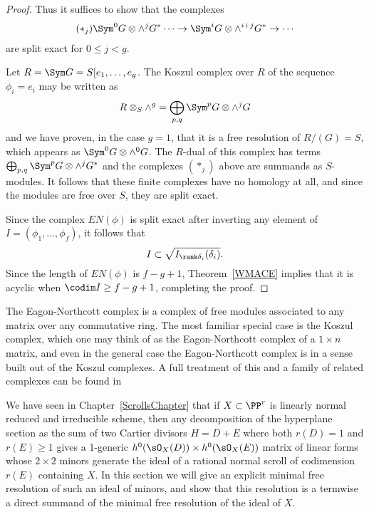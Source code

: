 \begin{proof}
Thus it suffices to show that the complexes
$$
\begin{aligned}
 (*_{j}) \Sym^{0}G\otimes\wedge^{j}G^{*}\cdots \to \Sym^{i}G \otimes  \wedge^{i+j}G^{*}  \to \cdots
\end{aligned}
$$
are split exact for $0\leq j<g$.

Let $R = \Sym G = S[e_{1}, \dots, e_{g}$. The Koszul complex over $R$ of the sequence $\phi_{i} = e_{i}$
may be written as
$$
R\otimes_{S} \wedge^{g} = \bigoplus_{p,q}\Sym^{p}G\otimes\wedge^{j}G
$$
and we have proven, in the case $g=1$, that it is a free resolution of $R/(G)=S$, which appears
as $\Sym^{0}G\otimes \wedge^{0}G$. The $R$-dual of this complex has terms
$\bigoplus_{p,q}\Sym^{p}G\otimes\wedge^{j}G^{*}$
and the complexes $(*_{j})$ above are summands as $S$-modules. It follows that these finite
complexes have no homology at all, and since the modules are free over $S$, they are split exact.

Since the 
complex $EN(\phi)$ is split exact after inverting any element of $I = (\phi_{1}, \dots, \phi_{f})$, it follows that 
$$
I \subset \sqrt{I_{\rank \delta_{i}}(\delta_{i})}. 
$$
Since the length of $EN(\phi)$  is $f-g+1$, Theorem~\ref{WMACE} implies that
it is acyclic when $\codim I\geq f-g+1$, completing the proof.
\end{proof}




The Eagon-Northcott complex is a complex of free modules associated to any matrix over any commutative ring. The most familiar special case is the Koszul complex, which one may think of as the Eagon-Northcott complex of a $1\times n$ matrix, and  even in the general case the Eagon-Northcott complex is in a sense built out of the Koszul complexes. A full treatment of this and a family of related complexes can be found in 

We have seen in Chapter~\ref{ScrollsChapter} that if $X\subset \PP^r$ is linearly normal reduced and irreducible scheme, then any decomposition
of the hyperplane section as the sum of two Cartier divisors
 $H = D+E$ where both $r(D) = 1$ and $r(E)\geq 1$ gives a 1-generic $h^0(\sO_X(D)) \times h^0(\sO_X(E))$
 matrix of linear forms whose $2\times 2$ minors generate the ideal of a rational normal scroll of codimension $r(E)$
 containing $X$. In this section we will give an explicit minimal free resolution of such an ideal of minors, and show that 
 this resolution is a termwise a direct summand of the
 minimal free resolution of the ideal of $X$.


